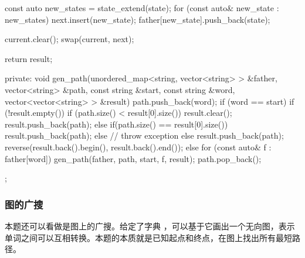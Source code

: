 \begin{Code}
{{{{                const auto new_states = state_extend(state);
                for (const auto& new_state : new_states) {
                    next.insert(new_state);
                    father[new_state].push_back(state);
                }
            }

            current.clear();
            swap(current, next);
        }

        return result;
    }
private:
    void gen_path(unordered_map<string, vector<string> > &father,
            vector<string> &path, const string &start, const string &word,
            vector<vector<string> > &result) {
        path.push_back(word);
        if (word == start) {
            if (!result.empty()) {
                if (path.size() < result[0].size()) {
                    result.clear();
                    result.push_back(path);
                } else if(path.size() == result[0].size()) {
                    result.push_back(path);
                } else {
                    // throw exception
                }
            } else {
                result.push_back(path);
            }
            reverse(result.back().begin(), result.back().end());
        } else {
            for (const auto& f : father[word]) {
                gen_path(father, path, start, f, result);
            }
        }
        path.pop_back();
    }
};
\end{Code}


\subsubsection{图的广搜}

本题还可以看做是图上的广搜。给定了字典 ，可以基于它画出一个无向图，表示单词之间可以互相转换。本题的本质就是已知起点和终点，在图上找出所有最短路径。

